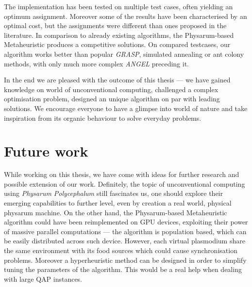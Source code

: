 The implementation has been tested on multiple test cases, often yielding an optimum assignment. Moreover some of the results have been characterised by an optimal cost, but the assignments were different than ones proposed in the literature. In comparison to already existing algorithms, the Physarum-based Metaheuristic produces a competitive solutions. On compared testcases, our algorithm works better than popular \textit{GRASP}, simulated annealing or ant colony methods, with only much more complex \textit{ANGEL} preceding it.

In the end we are pleased with the outcome of this thesis --- we have gained knowledge on world of unconventional computing, challenged a complex optimisation problem, designed an unique algorithm on par with leading solutions. We encourage everyone to have a glimpse into world of nature and take inspiration from its organic behaviour to solve everyday problems.


\section*{Future work}

While working on this thesis, we have come with ideas for further research and possible extension of our work. Definitely, the topic of unconventional computing using \textit{Physarum Polycephalum} still fascinates us, one should explore their emerging capabilities to further level, even by creation a real world, physical physarum machine. On the other hand, the Physarum-based Metaheuristic algorithm could have been reimplemented on GPU devices, exploiting their power of massive parallel computations --- the algorithm is population based, which can be easily distributed across such device. However, each virtual plasmodium share the same environment with its food sources which could cause synchronisation problems. Moreover a hyperheuristic method can be designed in order to simplify tuning the parameters of the algorithm. This would be a real help when dealing with large QAP instances.
